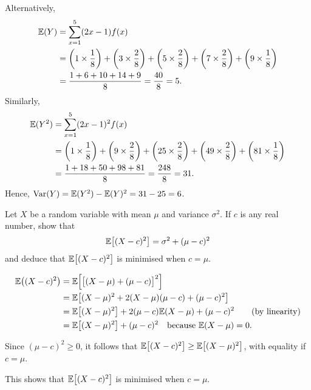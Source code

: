 \begin{exercise}
\begin{questions}
\begin{parts}
\begin{answer}
Alternatively, 
\begin{align*}
\mathbb{E}(Y) 
			& = \sum_{x=1}^5 (2x-1)f(x) \\
			& = \left(1\times\frac{1}{8}\right) + \left(3\times\frac{2}{8}\right) + \left(5\times\frac{2}{8}\right) + 
					\left(7\times\frac{2}{8}\right) + \left(9\times\frac{1}{8}\right) \\
			& = \frac{1+6+10+14+9}{8} = \frac{40}{8} = 5. \\
\end{align*}
Similarly,
\begin{align*}
\mathbb{E}(Y^2)	
			& = \sum_{x=1}^5 (2x-1)^2f(x) \\
			& = \left(1\times\frac{1}{8}\right) + \left(9\times\frac{2}{8}\right) + \left(25\times\frac{2}{8}\right) + 
					\left(49\times\frac{2}{8}\right) + \left(81\times\frac{1}{8}\right) \\
			& = \frac{1+18+50+98+81}{8} = \frac{248}{8} = 31. \\
\end{align*}
Hence, $\text{Var}(Y) = \mathbb{E}(Y^2)-\mathbb{E}(Y)^2 = 31 - 25 = 6$.
\end{answer}
\end{parts}

\question
Let $X$ be a random variable with mean $\mu$ and variance $\sigma^2$. If $c$ is any real number, show that 
\[
\mathbb{E}\big[(X-c)^2\big] = \sigma^2 + (\mu-c)^2
\]
and deduce that $\mathbb{E}\big[(X-c)^2\big]$ is minimised when $c=\mu$.
\begin{answer}
\begin{align*}
\mathbb{E}\big((X-c)^2\big)
	& = \mathbb{E}\Big[\big[(X-\mu)+(\mu-c)\big]^2\Big] \\
	& = \mathbb{E}\big[(X-\mu)^2 + 2(X-\mu)(\mu-c) + (\mu-c)^2\big] \\
	& = \mathbb{E}\big[(X-\mu)^2\big] + 2(\mu-c)\mathbb{E}(X-\mu) + (\mu-c)^2 \qquad\text{(by linearity)}\\
	& = \mathbb{E}\big[(X-\mu)^2\big] + (\mu-c)^2\quad \text{because $\mathbb{E}(X-\mu) = 0$.}
\end{align*}

Since $(\mu-c)^2\geq 0$, it follows that $\mathbb{E}\big[(X-c)^2\big] \geq \mathbb{E}\big[(X-\mu)^2\big]$, with equality if $c=\mu$. 

This shows that $\mathbb{E}\big[(X-c)^2\big]$ is minimised when $c=\mu$.
\end{answer}


\end{questions}
\end{exercise}
\endinput
